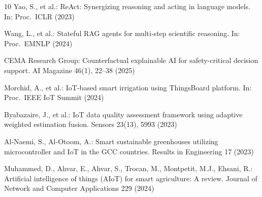 \documentclass[runningheads]{llncs}
\begin{document}
\begin{thebibliography}{10}
Yao, S., et al.: ReAct: Synergizing reasoning and acting in language models. In: Proc.\ ICLR (2023)

Wang, L., et al.: Stateful RAG agents for multi-step scientific reasoning. In: Proc.\ EMNLP (2024)

CEMA Research Group: Counterfactual explainable AI for safety-critical decision support. AI Magazine 46(1), 22--38 (2025)

Morchid, A., et al.: IoT-based smart irrigation using ThingsBoard platform. In: Proc.\ IEEE IoT Summit (2024)

Byabazaire, J., et al.: IoT data quality assessment framework using adaptive weighted estimation fusion. Sensors 23(13), 5993 (2023)

Al-Naemi, S., Al-Otoom, A.: Smart sustainable greenhouses utilizing microcontroller and IoT in the GCC countries. Results in Engineering 17 (2023)

Muhammed, D., Ahvar, E., Ahvar, S., Trocan, M., Montpetit, M.J., Ehsani, R.: Artificial intelligence of things (AIoT) for smart agriculture: A review. Journal of Network and Computer Applications 229 (2024)

\end{thebibliography}
\end{document}
